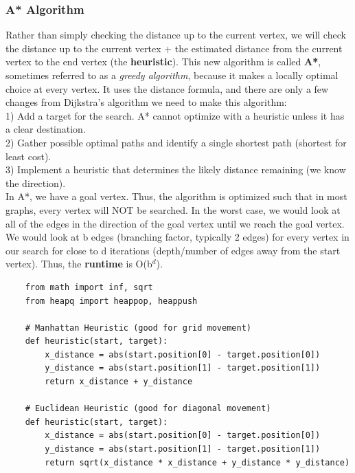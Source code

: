 \documentclass[11pt, a4paper]{article}
\begin{document}
\begin{spacing}{1.1}
	\subsubsection{A* Algorithm}
	Rather than simply checking the distance up to the current vertex, we will check the distance up to the current vertex + the estimated distance from the current vertex to the end vertex (the \textbf{heuristic}). This new algorithm is called \textbf{A*}, sometimes referred to as a \textit{greedy algorithm}, because it makes a locally optimal choice at every vertex. It uses the distance formula, and there are only a few changes from Dijkstra’s algorithm we need to make this algorithm: \vspace*{1mm} \\
	\hspace*{3mm} 1) Add a target for the search. A* cannot optimize with a heuristic unless it has a clear destination. \\
	\hspace*{3mm} 2) Gather possible optimal paths and identify a single shortest path (shortest for least cost). \\
	\hspace*{3mm} 3) Implement a heuristic that determines the likely distance remaining (we know the direction). \vspace*{2mm} \\
	In A*, we have a goal vertex. Thus, the algorithm is optimized such that in most graphs, every vertex will NOT be searched. In the worst case, we would look at all of the edges in the direction of the goal vertex until we reach the goal vertex. We would look at b edges (branching factor, typically 2 edges) for every vertex in our search for close to d iterations (depth/number of edges away from the start vertex). Thus, the \textbf{runtime} is O(b$^d$).
	\begin{lstlisting}
	from math import inf, sqrt
	from heapq import heappop, heappush
	
	# Manhattan Heuristic (good for grid movement)
	def heuristic(start, target):
		x_distance = abs(start.position[0] - target.position[0])
		y_distance = abs(start.position[1] - target.position[1])
		return x_distance + y_distance
	
	# Euclidean Heuristic (good for diagonal movement)
	def heuristic(start, target):
		x_distance = abs(start.position[0] - target.position[0])
		y_distance = abs(start.position[1] - target.position[1])
		return sqrt(x_distance * x_distance + y_distance * y_distance) \end{lstlisting} \newpage


\end{spacing}
\end{document}
